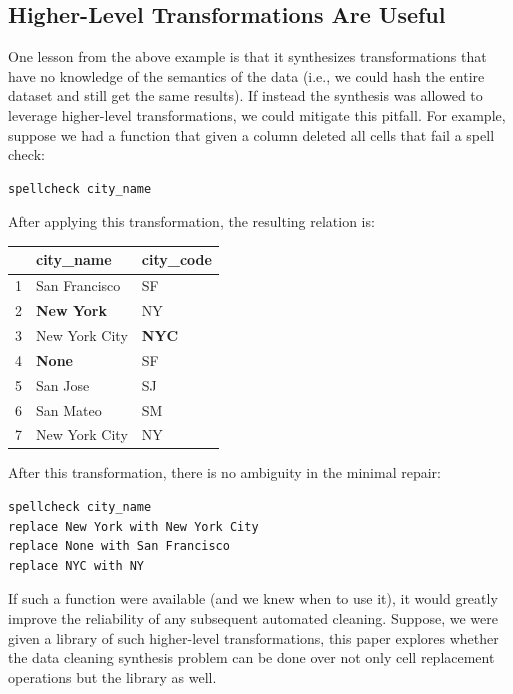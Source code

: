 \subsection{Higher-Level Transformations Are Useful}
One lesson from the above example is that it synthesizes transformations that have no knowledge of the semantics of the data (i.e., we could hash the entire dataset and still get the same results).
If instead the synthesis was allowed to leverage higher-level transformations, we could mitigate this pitfall.
For example, suppose we had a function that given a column deleted all cells that fail a spell check:
\begin{lstlisting}
spellcheck city_name
\end{lstlisting}
After applying this transformation, the resulting relation is:
\begin{table}[ht!]
\centering
\label{my-label}
\begin{tabular}{|l|l|l|}
\hline
\rowcolor[HTML]{000000} 
& {\color[HTML]{FFFFFF} city\_name}            & {\color[HTML]{FFFFFF} city\_code}   \\ \hline
1 & San Francisco                                & SF                                  \\ \hline
2& {\color[HTML]{FE0000} \textbf{New York}}     & NY                                  \\ \hline
3 & New York City                                & {\color[HTML]{FE0000} \textbf{NYC}} \\ \hline
4 & {\color[HTML]{005500} \textbf{None}} & SF                                  \\ \hline
5 & San Jose                                     & SJ                                  \\ \hline
6 & San Mateo                                    & SM                                  \\ \hline
7 & New York City                                & NY                                  \\ \hline
\end{tabular}
\end{table}

After this transformation, there is no ambiguity in the minimal repair:
\begin{lstlisting}
spellcheck city_name
replace New York with New York City
replace None with San Francisco
replace NYC with NY
\end{lstlisting}
If such a function were available (and we knew when to use it), it would greatly improve the reliability of any subsequent automated cleaning.
Suppose, we were given a library of such higher-level transformations, this paper explores whether the data cleaning synthesis problem can be done over not only cell replacement operations but the library as well.


